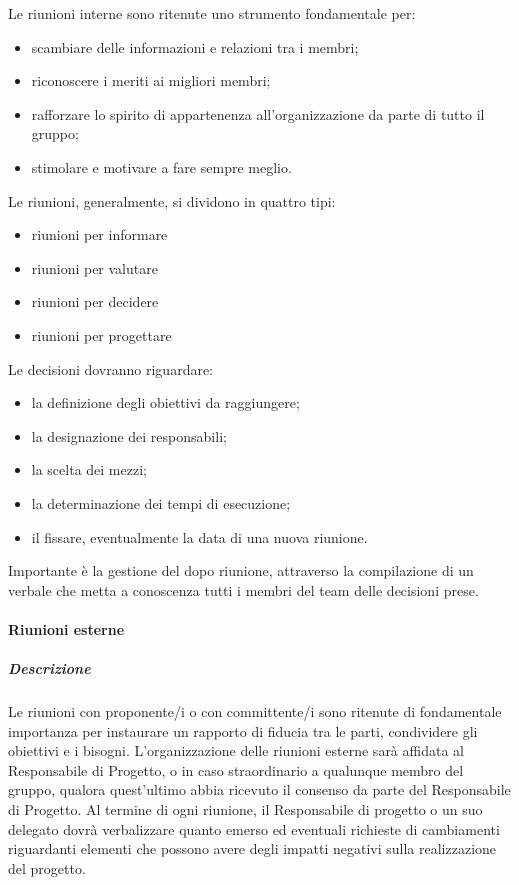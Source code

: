 Le riunioni interne sono ritenute uno strumento fondamentale per:
\begin{itemize}
\item
scambiare delle informazioni e relazioni tra i membri;
\item
riconoscere  i  meriti  ai  migliori membri;
\item
rafforzare lo spirito di appartenenza all'organizzazione da parte di tutto il gruppo;
\item
stimolare e motivare a fare sempre meglio.
\end{itemize}

Le riunioni, generalmente, si dividono in quattro tipi:
\begin{itemize}
\item
riunioni per informare
\item 
riunioni per valutare
\item
riunioni per decidere
\item 
riunioni per progettare 
\end{itemize}

Le decisioni dovranno riguardare:
\begin{itemize}
\item
la definizione degli obiettivi da raggiungere;
\item 
la designazione dei responsabili;
\item
la scelta dei mezzi;
\item
la determinazione dei tempi di esecuzione;
\item
il fissare, eventualmente la data di una nuova riunione.
\end{itemize}

Importante è la gestione del dopo riunione, attraverso la compilazione di un verbale che metta a conoscenza tutti i membri del team delle decisioni prese.

\paragraph{Riunioni esterne}
\subparagraph{Descrizione}
Le riunioni con proponente/i o con committente/i sono ritenute di fondamentale importanza per instaurare un rapporto di fiducia tra le parti, condividere gli obiettivi e i bisogni.
L'organizzazione delle riunioni esterne sarà affidata al Responsabile di Progetto, o in caso straordinario a qualunque membro del gruppo, qualora quest'ultimo abbia ricevuto il consenso da parte del Responsabile di Progetto.
Al termine di ogni riunione, il Responsabile di progetto o un suo delegato dovrà verbalizzare quanto emerso ed eventuali richieste di cambiamenti riguardanti elementi che possono avere degli impatti negativi sulla realizzazione del progetto.

